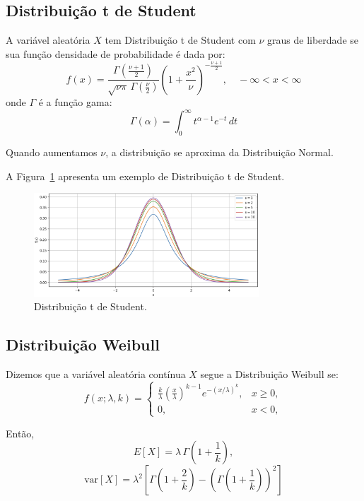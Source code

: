\documentclass{article}
\begin{document}
\subsection{Distribuição t de Student}
A variável aleatória $X$ tem Distribuição t de Student com $\nu$ graus de liberdade se sua função densidade de probabilidade é dada por:
    $$
    f(x) = \frac{\Gamma\left(\frac{\nu+1}{2}\right)}{\sqrt{\nu \pi} \, \Gamma\left(\frac{\nu}{2}\right)} \left(1 + \frac{x^2}{\nu} \right)^{-\frac{\nu+1}{2}}, \quad -\infty < x < \infty
    $$
onde $\Gamma$ é a função gama:
    $$
    \Gamma(\alpha) = \int_0^{\infty} t^{\alpha - 1} e^{-t} \, dt
    $$

Quando aumentamos $\nu$, a distribuição se aproxima da Distribuição Normal.

A Figura~\ref{fig:dist_cont_tstudent} apresenta um exemplo de Distribuição t de Student.

\begin{figure}[H]
    \centering    \includegraphics[width=0.75\textwidth]{figuras/dist_cont_tstudent.png}
    \caption{Distribuição t de Student.}
    \label{fig:dist_cont_tstudent}
\end{figure}

\subsection{Distribuição Weibull}

Dizemos que a variável aleatória contínua $X$ segue a Distribuição Weibull se:
    $$
    f(x; \lambda, k) =
    \begin{cases}
    \frac{k}{\lambda} \left( \frac{x}{\lambda} \right)^{k-1} e^{-(x/\lambda)^k}, & x \ge 0, \\
    0, & x < 0,
    \end{cases}
    $$

Então,
    $$
    E[X] = \lambda \, \Gamma\left(1 + \frac{1}{k}\right),
    $$
    $$
    \mathrm{var}[X] = \lambda^2 \left[ \Gamma\left( 1 + \frac{2}{k} \right) - \left( \Gamma\left( 1 + \frac{1}{k} \right) \right)^2 \right]
    $$
\end{document}
